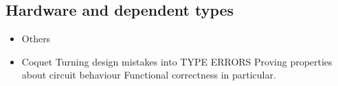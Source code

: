
        \subsection{Hardware and dependent types}
        \label{sec:hardware-dtp}
            \begin{itemize}
                \item Others
                \item Coquet
                    \subitem Turning design mistakes into TYPE ERRORS
                    \subitem Proving properties about circuit behaviour
                    \subsubitem Functional correctness in particular.
            \end{itemize}
